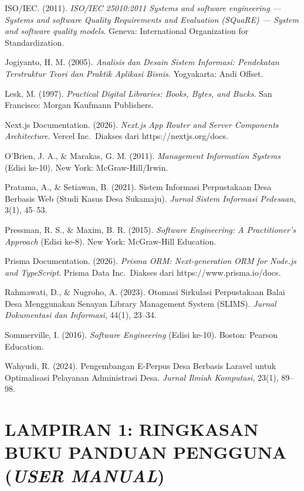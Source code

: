 \documentclass[
  indonesian,
  12pt,
]{report}
\begin{document}
ISO/IEC. (2011). \emph{ISO/IEC 25010:2011 Systems and software
engineering --- Systems and software Quality Requirements and Evaluation
(SQuaRE) --- System and software quality models}. Geneva: International
Organization for Standardization.

Jogiyanto, H. M. (2005). \emph{Analisis dan Desain Sistem Informasi:
Pendekatan Terstruktur Teori dan Praktik Aplikasi Bisnis}. Yogyakarta:
Andi Offset.

Lesk, M. (1997). \emph{Practical Digital Libraries: Books, Bytes, and
Bucks}. San Francisco: Morgan Kaufmann Publishers.

Next.js Documentation. (2026). \emph{Next.js App Router and Server
Components Architecture}. Vercel Inc.~Diakses dari
https://nextjs.org/docs.

O'Brien, J. A., \& Marakas, G. M. (2011). \emph{Management Information
Systems} (Edisi ke-10). New York: McGraw-Hill/Irwin.

Pratama, A., \& Setiawan, B. (2021). Sistem Informasi Perpustakaan Desa
Berbasis Web (Studi Kasus Desa Sukamaju). \emph{Jurnal Sistem Informasi
Pedesaan}, 3(1), 45--53.

Pressman, R. S., \& Maxim, B. R. (2015). \emph{Software Engineering: A
Practitioner's Approach} (Edisi ke-8). New York: McGraw-Hill Education.

Prisma Documentation. (2026). \emph{Prisma ORM: Next-generation ORM for
Node.js and TypeScript}. Prisma Data Inc.~Diakses dari
https://www.prisma.io/docs.

Rahmawati, D., \& Nugroho, A. (2023). Otomasi Sirkulasi Perpustakaan
Balai Desa Menggunakan Senayan Library Management System (SLIMS).
\emph{Jurnal Dokumentasi dan Informasi}, 44(1), 23--34.

Sommerville, I. (2016). \emph{Software Engineering} (Edisi ke-10).
Boston: Pearson Education.

Wahyudi, R. (2024). Pengembangan E-Perpus Desa Berbasis Laravel untuk
Optimalisasi Pelayanan Administrasi Desa. \emph{Jurnal Ilmiah
Komputasi}, 23(1), 89--98.

\newpage

\chapter*{\texorpdfstring{LAMPIRAN 1: RINGKASAN BUKU PANDUAN PENGGUNA
(\emph{USER
MANUAL})}{LAMPIRAN 1: RINGKASAN BUKU PANDUAN PENGGUNA (USER MANUAL)}}\label{lampiran-1-ringkasan-buku-panduan-pengguna-user-manual}
\end{document}
